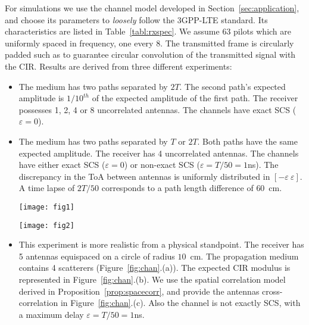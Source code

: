\documentclass[journal,10pt]{IEEEtran}
\providecommand{\xp}[1]{\textsf{Exp.~{#1}}\ }
\begin{document}
For simulations we use the channel model developed in Section~\ref{sec:application}, and choose its parameters to \emph{loosely} follow the 3GPP-LTE standard. Its characteristics are listed in Table~\ref{tabl:rxspec}. We assume 63 pilots which are uniformly spaced in frequency, one every 8.  The transmitted frame is circularly padded such as to guarantee circular convolution of the transmitted signal with the CIR. 
Results are derived from three different experiments:
\begin{itemize}
\item[\textsf A] The medium has two paths separated by $2T$. The second path's expected amplitude is $1/10^{th}$ of the expected amplitude of the first path. The receiver possesses 1, 2, 4 or 8 uncorrelated antennas. The channels have exact SCS ($\varepsilon=0$).
\item[\textsf B] The medium has two paths separated by $T$ or $2T$. Both paths have the same expected amplitude. The receiver has 4 uncorrelated antennas. The channels have either exact SCS ($\varepsilon=0$) or non-exact SCS ($\varepsilon=T/50=1$ns). The discrepancy in the ToA between antennas is uniformly distributed in $[-\varepsilon\ \varepsilon]$. A time lapse of $2T/50$ corresponds to a path length difference of $60$~cm. 

\begin{figure*}[ht!]
  \centering
\texttt{[image: fig1]}
\caption{ (\xp A) For the same global input SNR, a system with more antennas estimates the ToAs more accurately and is more resilient to noise. This is a consequence of the increased receiver diversity. The second path has $1/10^\text{th}$ the amplitude of the first path and is thus quickly buried into noise as SNR decreases. The estimation reaches the Cram\'er-Rao bound as long as it correctly identifies the path.}
\label{fig:fig1}\end{figure*}

\begin{figure*}[ht!]
  \centering
\texttt{[image: fig2]}
\caption{ (\xp A) Part (a) shows the performances of Block ESPRIT-TLS with or without Block Cadzow denoising. In this setup, the gain obtained with the denoising is relatively small and is achieved after one iteration. Part (b) shows the performances of Block Prony-TLS with or without Block Cadzow denoising. As expected, the performance of Prony's algorithm without denoising is very poor. After 3 denoising iterations, performances of Block Prony-TLS and Block ESPRIT-TLS are indistinguishable.
}
\label{fig:fig2}
\end{figure*}



\item[\textsf C] This experiment is more realistic from a physical standpoint. The receiver has 5 antennas equispaced on a circle of radius $10$~cm. The propagation medium contains 4 scatterers (Figure~\ref{fig:chan}.(a)). The expected CIR modulus is represented in Figure~\ref{fig:chan}.(b).  We use the spatial correlation model derived in Proposition~\ref{prop:spacecorr}, and provide the antennas cross-correlation in Figure~\ref{fig:chan}.(c). Also the channel is not exactly SCS, with a maximum delay $\varepsilon=T/50=1$ns.
\end{itemize}
\end{document}
